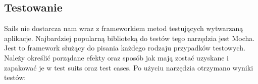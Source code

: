\documentclass[12pt]{report}
\begin{document}
    \subsection{Testowanie}
      Sails nie dostarcza nam wraz z frameworkiem metod testujących wytwarzaną aplikacje. 
      Najbardziej popularną biblioteką do testów tego narzędzia jest Mocha.
      Jest to framework służący do pisania każdego rodzaju przypadków testowych.
      Należy określić porządane efekty oraz sposób jak mają zostać uzyskane i zapakować je w test suits oraz test cases.
      Po użyciu narzędzia otrzymano wyniki testów:
      \newline
      \newline
      \newline
      \newline
      \newline
      \newline
      \newline
      \newline
      \newline
      \newline
      \newline
      \newline
      \newline
      \newline
      \newline
      \newline
      \newline
      \newline
      \newline
      \newline
      \newline
      \newline
      \newline
      \newline
      \newline
      \newline
      \newline
      \newline
      \newline
      \newline
      \newline
      \newline
      \newline
      \newline
      \newline
      \newline
\end{document}
